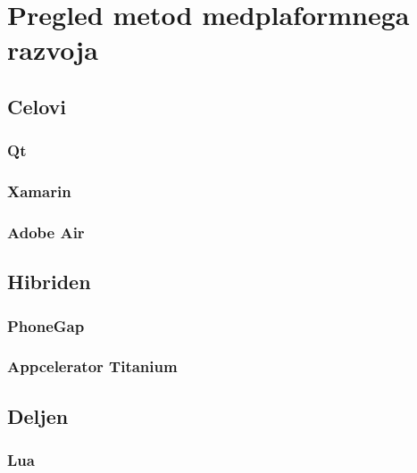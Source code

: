 \graphicspath{{img/}}









\chapter{Pregled metod medplaformnega razvoja}
\label{chap:overview}


\section{Celovi}

\subsection{Qt}

\subsection{Xamarin}

\subsection{Adobe Air}

\section{Hibriden}

\subsection{PhoneGap}

\subsection{Appcelerator Titanium}

\section{Deljen}

\subsection{Lua}

